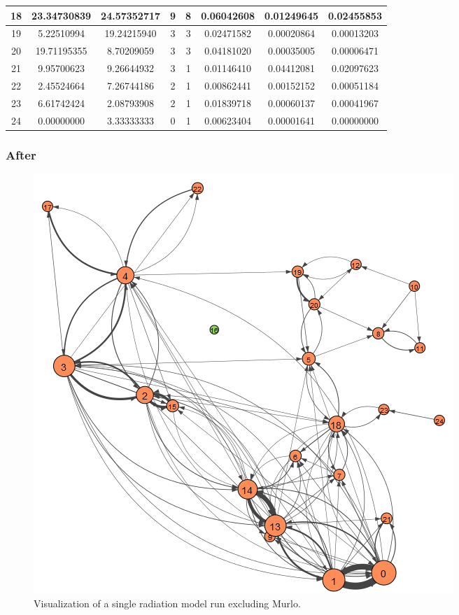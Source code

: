 \documentclass[12pt,a4paper]{thesis}
\begin{document}
\begin{table}[H]
\begin{tabular}{|c|c|c|c|c|c|c|c|}
\hline	18	&	23.34730839	&	24.57352717	&	9	&	8	&	0.06042608	&	0.01249645	&	0.02455853	\\
\hline	19	&	5.22510994	&	19.24215940	&	3	&	3	&	0.02471582	&	0.00020864	&	0.00013203	\\
\hline	20	&	19.71195355	&	8.70209059	&	3	&	3	&	0.04181020	&	0.00035005	&	0.00006471	\\
\hline	21	&	9.95700623	&	9.26644932	&	3	&	1	&	0.01146410	&	0.04412081	&	0.02097623	\\
\hline	22	&	2.45524664	&	7.26744186	&	2	&	1	&	0.00862441	&	0.00152152	&	0.00051184	\\
\hline	23	&	6.61742424	&	2.08793908	&	2	&	1	&	0.01839718	&	0.00060137	&	0.00041967	\\
\hline	24	&	0.00000000	&	3.33333333	&	0	&	1	&	0.00623404	&	0.00001641	&	0.00000000	\\
\hline 
\end{tabular} 
\label{tab:radNodeBefore}
\end{table}

\subsubsection{After}

\begin{figure}[H]
\centering
\includegraphics[width=0.9\linewidth]{./AfterViz/radModel}
\caption{Visualization of a single radiation model run excluding Murlo.}
\label{fig:radModelAfter}
\end{figure}
\end{document}
